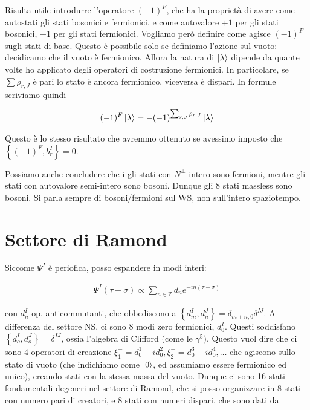 \documentclass{report}
\begin{document}
Risulta utile introdurre l'operatore \((-1)^F\), che ha la proprietà di avere come autostati gli stati bosonici e fermionici, e come autovalore \(+1\) per gli stati bosonici, \(-1\) per gli stati fermionici. Vogliamo però definire come agisce \((-1)^F\) sugli stati di base. Questo è possibile solo se definiamo l'azione sul vuoto: decidicamo che il vuoto è fermionico. Allora la natura di \(\ket{\lambda}\) dipende da quante volte ho applicato degli operatori di costruzione fermionici. In particolare, se \(\sum \rho_{r, J}\) è pari lo stato è ancora fermionico, viceversa è dispari. In formule scriviamo quindi 

\begin{align}
    (-1)^F \ket{\lambda} = -(-1)^{\sum_{r,J}\rho_{r, J}}\ket{\lambda}
\end{align}

Questo è lo stesso risultato che avremmo ottenuto se avessimo imposto che \(\left\{ (-1)^F, b_r^I \right\} = 0\). 

Possiamo anche concludere che i gli stati con \(N^\perp\) intero sono fermioni, mentre gli stati con autovalore semi-intero sono bosoni. Dunque gli 8 stati massless sono bosoni. Si parla sempre di bosoni/fermioni sul WS, non sull'intero spaziotempo. 

\section{Settore di Ramond}

Siccome \(\Psi^I\) è periofica, posso espandere in modi interi: 

\begin{align}
    \Psi^I (\tau-\sigma) \propto \sum_{n \in \mathbb{Z}} d_n e^{-in(\tau-\sigma)}
\end{align}

con \(d_n^I\) op. anticommutanti, che obbediscono a \(\left\{ d_m^I, d_n^J \right\} = \delta_{m+n, 0}\delta^{IJ}\). A differenza del settore NS, ci sono 8 modi zero fermionici, \(d_0^I\). Questi soddisfano \(\left\{ d_o^I, d_o^J \right\}  = \delta^{IJ}\), ossia l'algebra di Clifford (come le \(\gamma^5\)). Questo vuol dire che ci sono 4 operatori di creazione \(\xi_1^- = d_0^1 - id_0^2, \xi_2^- = d_0^3 - id_0^4, \ldots\) che agiscono sullo stato di vuoto (che indichiamo come \(\ket{0}\), ed assumiamo essere fermionico ed unico), creando stati con la stessa massa del vuoto. Dunque ci sono 16 stati fondamentali degeneri nel settore di Ramond, che si posso organizzare in 8 stati con numero pari di creatori, e 8 stati con numeri dispari, che sono dati da 
\end{document}
